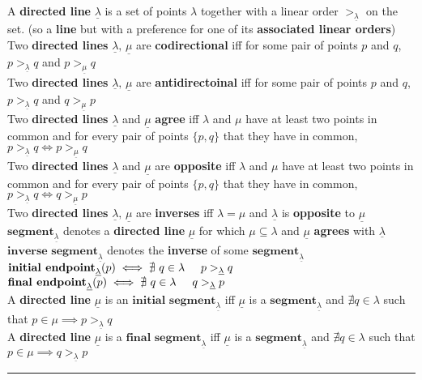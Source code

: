\documentclass{article}
\newcommand{\hsp}[1][5]{\hspace{0.#1 cm}}
\newcommand{\nl}[1][12]{\\[#1pt]}
\newcommand {\chb}[1]{\textbf{#1}}
\newcommand{\ul}[1]{\underline{#1}}
\begin{document}
\begin{flushleft}
A \chb{directed line} $\underline{\lambda}$ is a set of points $\lambda$ together with a linear order $>_{\underline{\lambda}}$ on the set. (so a \chb{line} but with a preference for one of its \chb{associated linear orders})\nl[10]

\hsp[2] Two \chb{directed lines} $\underline{\lambda},\, \underline{\mu}$ are \chb{codirectional} iff for some pair of points $p$ and $q$, $p >_{\underline{\lambda}}q $ and $ p >_{\underline{\mu}}q$\nl[5]
\hsp[2] Two \chb{directed lines} $\underline{\lambda},\, \underline{\mu}$ are \chb{antidirectoinal} iff for some pair of points $p$ and $q$, $p >_{\underline{\lambda}}q $ and $ q >_{\underline{\mu}}p$\nl[5]
\hsp[2] Two \chb{directed lines} $\underline{\lambda}$ and $\underline{\mu}$ \chb{agree} iff $\lambda$ and $\mu$ have at least two points in common and for every pair of points $\{p,q\}$ that they have in common, $p >_{\underline{\lambda}}q \iff p >_{\underline{\mu}}q$\nl[5]
\hsp[2] Two \chb{directed lines} $\underline{\lambda}$ and $\underline{\mu}$ are \chb{opposite} iff $\lambda$ and $\mu$ have at least two points in common and for every pair of points $\{p,q\}$ that they have in common, $p >_{\underline{\lambda}}q \iff q >_{\underline{\mu}}p$\nl[5]
\hsp[2] Two \chb{directed lines} $\underline{\lambda},\, \underline{\mu}$ are \chb{inverses} iff $\lambda = \mu$ and $\underline{\lambda}$ is \chb{opposite} to $\underline{\mu}$\nl[10]

$\chb{segment}_{\underline{\lambda}}$ denotes a \chb{directed line} $\underline{\mu}$ for which $\mu \subseteq \lambda$ and $\underline{\mu}$ \chb{agrees} with $\underline{\lambda}$\nl[5]
\hsp[2] $\chb{inverse segment}_{\underline{\lambda}}$ denotes the \chb{inverse} of some $\chb{segment}_{\underline{\lambda}}$\nl[10]

\hsp[2] $\chb{initial endpoint}_{\ul{\lambda}}(p) \iff \nexists\ q \in \lambda\hsp p >_{\ul{\lambda}} q$\nl[5]
\hsp[2] $\chb{final endpoint}_{\ul{\lambda}}(p) \iff \nexists\ q \in \lambda\hsp q >_{\ul{\lambda}} p$\nl[10]

\hsp[2] A \chb{directed line} $\ul{\mu}$ is an $\chb{initial segment}_{\ul{\lambda}}$ iff $\ul{\mu}$ is a $\chb{segment}_{\ul{\lambda}}$ and $\nexists q \in \lambda$ such that $p \in \mu \implies p >_{\ul{\lambda}} q$\nl[5]
\hsp[2] A \chb{directed line} $\ul{\mu}$ is a $\chb{final segment}_{\ul{\lambda}}$ iff $\ul{\mu}$ is a $\chb{segment}_{\ul{\lambda}}$ and $\nexists q \in \lambda$ such that $p \in \mu \implies q >_{\ul{\lambda}} p$\nl[15]

\par\noindent\rule{\textwidth}{0.4pt}\nl[8] %


\end{flushleft}
\end{document}
